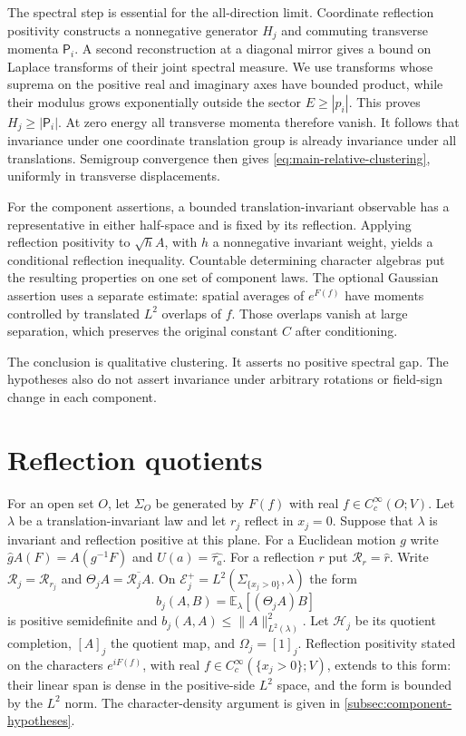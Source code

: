 \documentclass[11pt,letterpaper,reqno]{amsart}
\newcommand{\E}{\mathbb E}
\begin{document}
The spectral step is essential for the all-direction limit.
Coordinate reflection positivity constructs a nonnegative generator
\(H_j\) and commuting transverse momenta \(\mathsf P_i\).
A second reconstruction at a diagonal mirror gives a bound on
Laplace transforms of their joint spectral measure. We use
transforms whose suprema on the positive real and imaginary axes
have bounded product, while their modulus grows exponentially
outside the sector \(E\ge|p_i|\).
This proves \(H_j\ge|\mathsf P_i|\).
At zero energy all transverse momenta therefore vanish.
It follows that invariance under one coordinate translation group
is already invariance under all translations. Semigroup convergence
then gives \eqref{eq:main-relative-clustering}, uniformly in
transverse displacements.

For the component assertions, a bounded translation-invariant
observable has a representative in either half-space and is fixed
by its reflection. Applying reflection positivity to \(\sqrt h A\),
with \(h\) a nonnegative invariant weight, yields a conditional
reflection inequality. Countable determining character algebras
put the resulting properties on one set of component laws.
The optional Gaussian assertion uses a separate estimate:
spatial averages of \(e^{F(f)}\) have moments controlled by
translated \(L^2\) overlaps of \(f\). Those overlaps vanish at
large separation, which preserves the original constant \(C\)
after conditioning.

The conclusion is qualitative clustering. It asserts no positive
spectral gap. The hypotheses also do not assert invariance under
arbitrary rotations or field-sign change in each component.
\section{Reflection quotients}\label{sec:quotients}
For an open set $O$, let $\Sigma_O$ be generated by $F(f)$ with
real $f\in C_c^\infty(O;V)$. Let $\lambda$ be a
translation-invariant law and let $r_j$ reflect in $x_j=0$.
Suppose that $\lambda$ is invariant and reflection positive at this
plane. For a Euclidean motion $g$ write
$\widehat g A(F)=A(g^{-1}F)$ and $U(a)=\widehat{\tau_a}$.
For a reflection $r$ put
$\mathcal R_r=\widehat r$. Write $\mathcal R_j=\mathcal R_{r_j}$ and
$\Theta_j A=\overline{\mathcal R_j A}$.
On $\mathcal E_j^+=L^2(\Sigma_{\{x_j>0\}},\lambda)$ the form
\[
 b_j(A,B)=\E_\lambda[(\Theta_j A)B]
\]
is positive semidefinite and $b_j(A,A)\le\|A\|_{L^2(\lambda)}^2$.
Let $\mathcal H_j$ be its quotient completion, $[A]_j$ the quotient
map, and $\Omega_j=[1]_j$.
Reflection positivity stated on the characters $e^{iF(f)}$, with
real $f\in C_c^\infty(\{x_j>0\};V)$, extends to this form:
their linear span is dense in the positive-side $L^2$ space, and the
form is bounded by the $L^2$ norm. The character-density argument is
given in \cref{subsec:component-hypotheses}.
\end{document}
